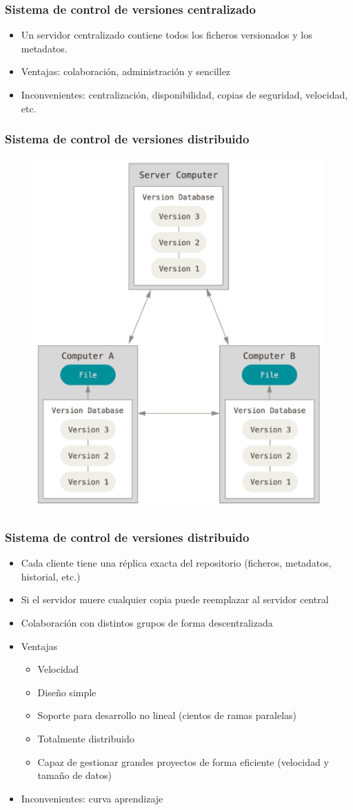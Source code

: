 \documentclass{beamer}
\begin{document}
\begin{frame}
\frametitle{Sistema de control de versiones centralizado}
\begin{itemize}
\item Un servidor centralizado contiene todos los ficheros versionados y los metadatos.
\item Ventajas: colaboración, administración y sencillez
\item Inconvenientes: centralización, disponibilidad, copias de seguridad, velocidad, etc.
\end{itemize}
\end{frame}

\begin{frame}
\frametitle{Sistema de control de versiones distribuido}
\begin{figure}
\includegraphics[width=0.50\linewidth]{img/distributed.png}
\end{figure}
\end{frame}

\begin{frame}
\frametitle{Sistema de control de versiones distribuido}
\begin{itemize}
\item Cada cliente tiene una réplica exacta del repositorio (ficheros, metadatos, historial, etc.)
\item Si el servidor muere cualquier copia puede reemplazar al servidor central
\item Colaboración con distintos grupos de forma descentralizada
\item Ventajas
\begin{itemize}
\item Velocidad
\item Diseño simple
\item Soporte para desarrollo no lineal (cientos de ramas paralelas)
\item Totalmente distribuido
\item Capaz de gestionar grandes proyectos de forma eficiente (velocidad y tamaño de datos)
\end{itemize}
\item Inconvenientes: curva aprendizaje
\end{itemize}
\end{frame}
\end{document}
